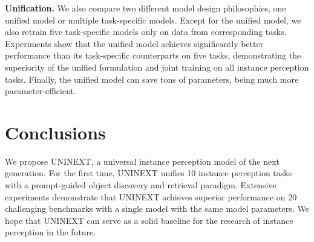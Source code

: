 \documentclass[10pt,twocolumn,letterpaper]{article}
\begin{document}
\textbf{Unification.} We also compare two different model design philosophies, one unified model or multiple task-specific models. Except for the unified model, we also retrain five task-specific models only on data from corresponding tasks. Experiments show that the unified model achieves significantly better performance than its task-specific counterparts on five tasks, demonstrating the superiority of the unified formulation and joint training on all instance perception tasks. 
Finally, the unified model can save tons of parameters, being much more parameter-efficient. 

\begin{table}[t]
    \caption{Ablations. The settings in our final model is underlined.}
    \centering
    { }
    \label{tab:ablation}
    \vspace{-3mm}
\end{table}

\section{Conclusions}
We propose UNINEXT, a universal instance perception model of the next generation. For the first time, UNINEXT unifies 10 instance perception tasks with a prompt-guided object discovery and retrieval paradigm. Extensive experiments demonstrate that UNINEXT achieves superior performance on 20 challenging benchmarks with a single model with the same model parameters. We hope that UNINEXT can serve as a solid baseline for the research of instance perception in the future.
\end{document}
